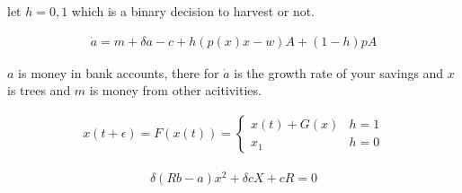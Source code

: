 \documentclass[12pt]{article}
\begin{document}
let $h = {0,1}$ which is a binary decision to harvest or not. 

\begin{align}
    \dot a = m + \delta a -c + h(p(x)x - w)A + (1-h)pA
\end{align}

$a$ is money in bank accounts, there for $\dot a$ is the growth rate of your savings and $x$ is trees and $m$ is money from other acitivities. 

\begin{align}
    x(t+\epsilon) = F(x(t)) = \begin{cases}
    x(t) + G(x) & h = 1\\
    x_1 & h = 0
    \end{cases}
\end{align}


\begin{align}
    \delta (Rb - a) x^2 + \delta c X + c R = 0
\end{align}
\end{document}
